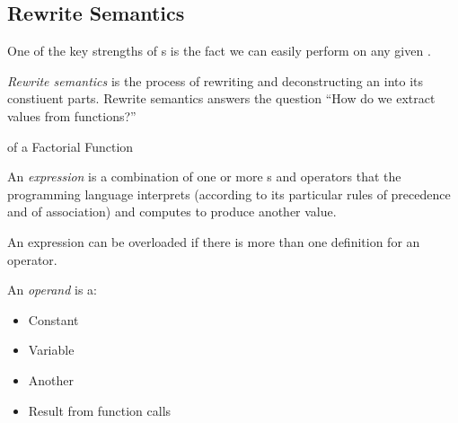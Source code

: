 \subsection{Rewrite Semantics}\label{subsec:Rewrite_Semantics}
One of the key strengths of s is the fact we can easily perform  on any given .

\begin{definition}\label{def:Rewrite_Semantics}
  \emph{Rewrite semantics} is the process of rewriting and deconstructing an  into its constiuent parts.
  Rewrite semantics answers the question ``How do we extract values from functions?''
\end{definition}

\begin{listing}[h!tbp]
\caption{ of a Factorial Function}
\label{lst:Rewrite_Semantics}
\end{listing}

\begin{definition}[Expression]\label{def:Expression}
  An \emph{expression} is a combination of one or more s and operators that the programming language interprets (according to its particular rules of precedence and of association) and computes to produce another value.

  \begin{remark}[Overloading]\label{rmk:Overloading_Expressions}
    An expression can be overloaded if there is more than one definition for an operator.
  \end{remark}
\end{definition}

\begin{definition}[Operand]\label{def:Operand}
  An \emph{operand} is a:
  \begin{itemize}[noitemsep]
  \item Constant
  \item Variable
  \item Another 
  \item Result from function calls
  \end{itemize}
\end{definition}

